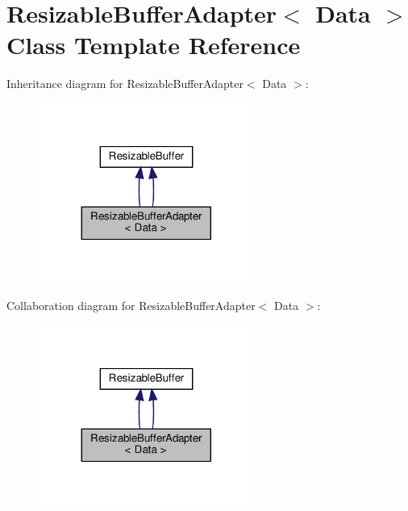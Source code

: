 \hypertarget{classResizableBufferAdapter_3_01Data_01_4}{}\section{Resizable\+Buffer\+Adapter$<$ Data $>$ Class Template Reference}
\label{classResizableBufferAdapter_3_01Data_01_4}


Inheritance diagram for Resizable\+Buffer\+Adapter$<$ Data $>$\+:
\nopagebreak
\begin{figure}[H]
\begin{center}
\leavevmode
\includegraphics[width=200pt]{classResizableBufferAdapter_3_01Data_01_4__inherit__graph}
\end{center}
\end{figure}


Collaboration diagram for Resizable\+Buffer\+Adapter$<$ Data $>$\+:
\nopagebreak
\begin{figure}[H]
\begin{center}
\leavevmode
\includegraphics[width=200pt]{classResizableBufferAdapter_3_01Data_01_4__coll__graph}
\end{center}
\end{figure}
